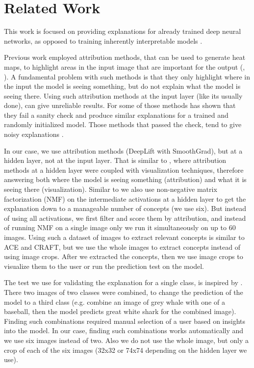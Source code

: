\section{Related Work}
This work is focused on providing explanations for already trained deep neural networks, as opposed to training inherently interpretable models \cite{Nauta_2023_CVPR}.

Previous work employed attribution methods, that can be used to generate heat maps, to highlight areas in the input image that are important for the output (\cite{shrikumar2019learning}, \cite{petsiuk2018rise}).
%
A fundamental problem with such methods is that they only highlight where in the input the model is seeing something, but do not explain what the model is seeing there.
%
Using such attribution methods at the input layer (like its usually done), can give unreliable results. For some of those methods \cite{SanityCheckSaliencyMaps} has shown that they fail a sanity check and produce similar explanations for a trained and randomly initialized model.
%
Those methods that passed the check, tend to give noisy explanations \cite{SmoothGrad}.

In our case, we use attribution methods (DeepLift with SmoothGrad), but at a hidden layer, not at the input layer.
%
That is similar to \cite{olah2018the}, where attribution methods at a hidden layer were coupled with visualization techniques, therefore answering both where the model is seeing something (attribution) and what it is seeing there (visualization).
%
Similar to \cite{olah2018the} we also use non-negative matrix factorization (NMF) \cite{Lee1999} on the intermediate activations at a hidden layer to get the explanation down to a manageable number of concepts (we use six). But instead of using all activations, we first filter and score them by attribution, and instead of running NMF on a single image only we run it simultaneously on up to 60 images.
%
Using such a dataset of images to extract relevant concepts is similar to ACE and CRAFT, but we use the whole images to extract concepts instead of using image crops.
%
After we extracted the concepts, then we use image crops to visualize them to the user or run the prediction test on the model.

The test we use for validating the explanation for a single class, is inspired by \cite{carter2019activation}.
%
%
There two images of two classes were combined, to change the prediction of the model to a third class (e.g. combine an image of grey whale with one of a baseball, then the model predicts great white shark for the combined image).
%
Finding such combinations required manual selection of a user based on insights into the model.
%
In our case, finding such combinations works automatically and we use six images instead of two.
%
Also we do not use the whole image, but only a crop of each of the six images (32x32 or 74x74 depending on the hidden layer we use).
%






